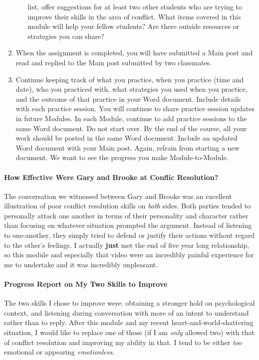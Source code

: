 \documentclass[stu,12pt]{apa7}
\begin{document}
\begin{enumerate}
\begin{itemize}
              list, offer suggestions for at least two other students who are
              trying to improve their skills in the area of conflict. What items
              covered in this module will help your fellow students? Are there
              outside resources or strategies you can share?
          \end{itemize}
        \item When the assignment is completed, you will have submitted a Main
          post and read and replied to the Main post  submitted by two
          classmates.
        \item Continue keeping track of what you practice, when you practice
          (time and date), who you practiced with, what strategies you used when
          you practice, and the outcome of that practice in your Word document.
          Include details with each practice session. You will continue to share
          practice session updates in future Modules. In each Module, continue
          to add practice sessions to the same Word document. Do not start over.
          By the end of the course, all your work should be posted in the same
          Word document. Include an updated Word document with your Main post.
          Again, refrain from starting a new document. We want to see the
          progress you make Module-to-Module.
      \end{enumerate}


    \newpage
    \paragraph{How Effective Were Gary and Brooke at Conflic Resolution?}
      The conversation we witnessed between Gary and Brooke was an excellent
        illustration of poor conflict resolution skills on \textit{both}
        sides. Both parties tended to personally attack one another in terms of
        their personality and character rather than focusing on whatever
        situation prompted the argument. Instead of listening to one-another,
        they simply tried to defend or justify their actions without regard
        to the other's feelings. I actually \textbf{just} met the end of five
        year long relationship, so this module and especially that video were
        an incredibly painful experience for me to undertake and it was
        incredibly unpleasant.

    \paragraph{Progress Report on My Two Skills to Improve}
      The two skills I chose to improve were: obtaining a stronger hold on
        psychological context, and listening during conversation with more of
        an intent to understand rather than to reply. After this module and my
        recent heart-and-world-shattering situation, I would like to replace one
        of those (if I am \textit{only} allowed two) with that of conflict
        resolution and improving my ability in that. I tend to be either
        \textit{too} emotional or appearing \textit{emotionless}.
\end{document}
